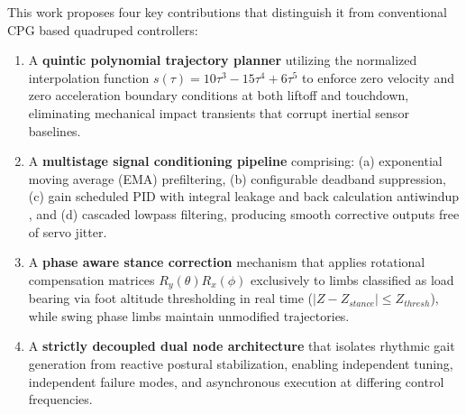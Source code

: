 This work proposes four key contributions that distinguish it from
conventional CPG based quadruped controllers:
\begin{enumerate}
    \item A \textbf{quintic polynomial trajectory planner}
    utilizing the normalized interpolation function
    $s(\tau)=10\tau^3-15\tau^4+6\tau^5$ to enforce zero velocity
    and zero acceleration boundary conditions at both liftoff and
    touchdown, eliminating mechanical impact transients that
    corrupt inertial sensor baselines.

    \item A \textbf{multistage signal conditioning pipeline}
    comprising: (a) exponential moving average (EMA) prefiltering, (b) configurable deadband suppression,
    (c) gain scheduled PID with integral leakage and back calculation
    antiwindup \cite{astrom2006advanced}, and
    (d) cascaded lowpass filtering, producing smooth
    corrective outputs free of servo jitter.

    \item A \textbf{phase aware stance correction} mechanism that
    applies rotational compensation matrices
    $R_y(\theta)R_x(\phi)$ exclusively to limbs classified as
    load bearing via foot altitude thresholding in real time
    ($|Z - Z_{stance}| \leq Z_{thresh}$), while swing phase limbs
    maintain unmodified trajectories.

    \item A \textbf{strictly decoupled dual node architecture} that
    isolates rhythmic gait generation from reactive postural
    stabilization, enabling independent tuning, independent
    failure modes, and asynchronous execution at differing
    control frequencies.
\end{enumerate}
